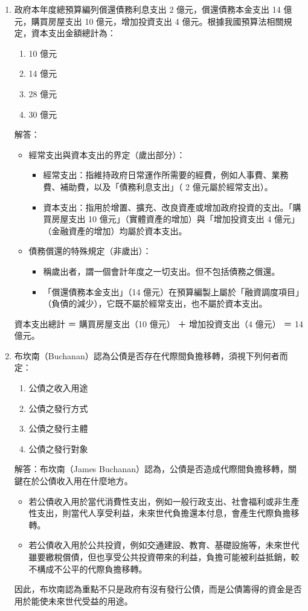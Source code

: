 \documentclass[12pt, a4paper]{article}
\begin{document}
\begin{enumerate}
    \item 政府本年度總預算編列償還債務利息支出 2 億元，償還債務本金支出 14 億元，購買房屋支出 10 億元，增加投資支出 4 億元。根據我國預算法相關規定，資本支出金額總計為：
    \begin{enumerate}[label=\Alph*.]
        \item 10 億元
        \item 14 億元
        \item 28 億元
        \item 30 億元
    \end{enumerate}
    解答：
    \begin{itemize}
        \item 經常支出與資本支出的界定（歲出部分）：
        \begin{itemize}
            \item 經常支出：指維持政府日常運作所需要的經費，例如人事費、業務費、補助費，以及「債務利息支出」（ 2 億元屬於經常支出）。
            \item 資本支出：指用於增置、擴充、改良資產或增加政府投資的支出。「購買房屋支出 10 億元」（實體資產的增加）與「增加投資支出 4 億元」（金融資產的增加）均屬於資本支出。
        \end{itemize}
        \item 債務償還的特殊規定（非歲出）：
        \begin{itemize}
            \item 稱歲出者，謂一個會計年度之一切支出。但不包括債務之償還。
            \item 「償還債務本金支出」（14 億元）在預算編製上屬於「融資調度項目」（負債的減少），它既不屬於經常支出，也不屬於資本支出。
        \end{itemize}
    \end{itemize}
    資本支出總計 ＝ 購買房屋支出（10 億元） ＋ 增加投資支出（4 億元） ＝ 14 億元。

    \item 布坎南（Buchanan）認為公債是否存在代際間負擔移轉，須視下列何者而定：
    \begin{enumerate}[label=\Alph*.]
        \item 公債之收入用途
        \item 公債之發行方式
        \item 公債之發行主體
        \item 公債之發行對象
    \end{enumerate}
    解答：布坎南（James Buchanan）認為，公債是否造成代際間負擔移轉，關鍵在於公債收入用在什麼地方。
    \begin{itemize}
        \item 若公債收入用於當代消費性支出，例如一般行政支出、社會福利或非生產性支出，則當代人享受利益，未來世代負擔還本付息，會產生代際負擔移轉。
        \item 若公債收入用於公共投資，例如交通建設、教育、基礎設施等，未來世代雖要繳稅償債，但也享受公共投資帶來的利益，負擔可能被利益抵銷，較不構成不公平的代際負擔移轉。
    \end{itemize}
    因此，布坎南認為重點不只是政府有沒有發行公債，而是公債籌得的資金是否用於能使未來世代受益的用途。


\end{enumerate}
\end{document}

